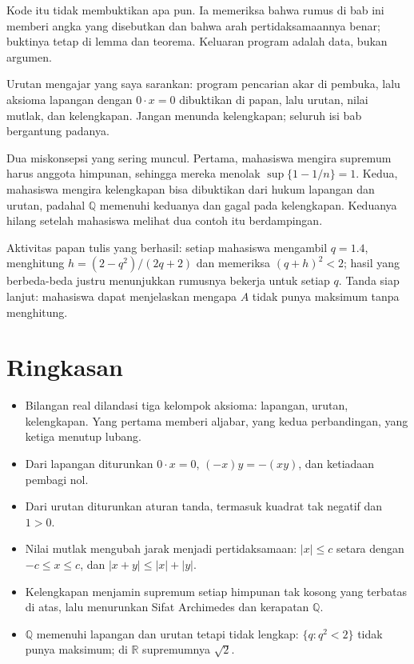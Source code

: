 Kode itu tidak membuktikan apa pun. Ia memeriksa bahwa rumus di bab ini memberi angka
yang disebutkan dan bahwa arah pertidaksamaannya benar; buktinya tetap di lemma dan
teorema. Keluaran program adalah data, bukan argumen.

\begin{untukdosen}
Urutan mengajar yang saya sarankan: program pencarian akar di pembuka, lalu aksioma
lapangan dengan $0\cdot x=0$ dibuktikan di papan, lalu urutan, nilai mutlak, dan
kelengkapan. Jangan menunda kelengkapan; seluruh isi bab bergantung padanya.

Dua miskonsepsi yang sering muncul. Pertama, mahasiswa mengira supremum harus anggota
himpunan, sehingga mereka menolak $\sup\{1-1/n\}=1$. Kedua, mahasiswa mengira
kelengkapan bisa dibuktikan dari hukum lapangan dan urutan, padahal $\mathbb{Q}$
memenuhi keduanya dan gagal pada kelengkapan. Keduanya hilang setelah mahasiswa melihat
dua contoh itu berdampingan.

Aktivitas papan tulis yang berhasil: setiap mahasiswa mengambil $q=1.4$, menghitung
$h=(2-q^2)/(2q+2)$ dan memeriksa $(q+h)^2<2$; hasil yang berbeda-beda justru menunjukkan
rumusnya bekerja untuk setiap $q$. Tanda siap lanjut: mahasiswa dapat menjelaskan mengapa
$A$ tidak punya maksimum tanpa menghitung.
\end{untukdosen}

\section{Ringkasan}

\begin{ringkasan}
\begin{itemize}
\item Bilangan real dilandasi tiga kelompok aksioma: lapangan, urutan, kelengkapan.
      Yang pertama memberi aljabar, yang kedua perbandingan, yang ketiga menutup lubang.
\item Dari lapangan diturunkan $0\cdot x=0$, $(-x)y=-(xy)$, dan ketiadaan pembagi nol.
\item Dari urutan diturunkan aturan tanda, termasuk kuadrat tak negatif dan $1>0$.
\item Nilai mutlak mengubah jarak menjadi pertidaksamaan: $|x|\le c$ setara dengan
      $-c\le x\le c$, dan $|x+y|\le|x|+|y|$.
\item Kelengkapan menjamin supremum setiap himpunan tak kosong yang terbatas di atas,
      lalu menurunkan Sifat Archimedes dan kerapatan $\mathbb{Q}$.
\item $\mathbb{Q}$ memenuhi lapangan dan urutan tetapi tidak lengkap: $\{q: q^2<2\}$
      tidak punya maksimum; di $\mathbb{R}$ supremumnya $\sqrt{2}$.
\end{itemize}
\end{ringkasan}

